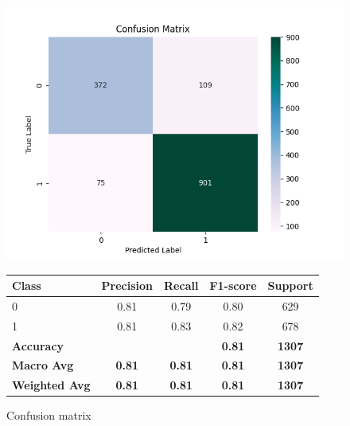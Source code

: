\documentclass{mcmthesis}
\begin{document}
\begin{figure}[ht]
    \centering
    \begin{minipage}{0.4\textwidth}
        \centering
        \includegraphics[width=\textwidth]{figures/conf_matrix.png} %
        \caption{Confusion matrix}
        \label{fig:conf}
    \end{minipage}\hfill
    \begin{minipage}{0.6\textwidth}
        \centering
        \label{tab:classification_report}
        \begin{tabular}{lcccc}
        \toprule
        Class & Precision & Recall & F1-score & Support \\
        \midrule
        0 & 0.81 & 0.79 & 0.80 & 629 \\
        1 & 0.81 & 0.83 & 0.82 & 678 \\
        \midrule
        \textbf{Accuracy} & & & \textbf{0.81} & \textbf{1307} \\
        \textbf{Macro Avg} & \textbf{0.81} & \textbf{0.81} & \textbf{0.81} & \textbf{1307} \\
        \textbf{Weighted Avg} & \textbf{0.81} & \textbf{0.81} & \textbf{0.81} & \textbf{1307} \\
        \bottomrule
        \end{tabular}
    \end{minipage}
    

\end{figure}
\end{document}

